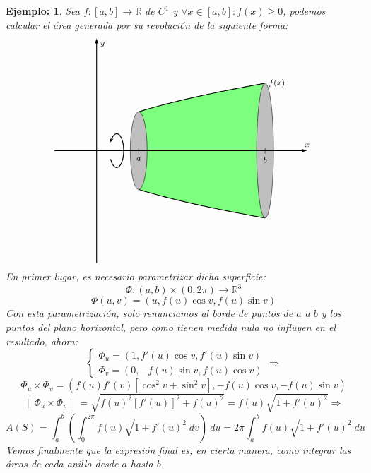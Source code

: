 \documentclass[10pt,a4paper,openright]{book}
\theoremstyle{break}
\newtheorem*{ej}{\underline{Ejemplo}:}
\newcommand{\dif}[1]{\ d#1}
\newcommand{\AxisRotator}[1][rotate=0]{
    \tikz [x=0.25cm,y=0.60cm,line width=.2ex,-stealth,#1] \draw (0,0) arc (-150:150:1 and 1);
    }
\begin{document}
\begin{ej}
Sea $f: \left[ a, b \right] \rightarrow \mathbb{R}$ de $C^1$ y $\forall x \in \left[ a, b \right]: f\left( x \right) \ge 0$, podemos calcular el área generada por su revolución de la siguiente forma:
$$      \begin{tikzpicture}[scale=1,>=latex,x=1.5cm,y=0.8cm]
        \fill[fill=green,opacity=0.5] (1,0) -- plot[domain=1:4] (\x,{sqrt(2*(\x)+1))}) -- (4,0);
        \fill[fill=green,opacity=0.5] (1,0) -- plot[domain=1:4] (\x,{-sqrt(2*(\x)+1))}) -- (4,0);
        \draw[-,thick,domain=1:4,samples=100] plot (\x,{sqrt(2*(\x)+1))}) node[right] {\footnotesize $f(x)$};
        \draw[-,thick,domain=1:4,samples=100] plot (\x,{-sqrt(2*(\x)+1))});
        \draw[fill=gray!50] (4,0) circle [x radius =.2 , y radius =3];
        \draw[fill=gray!50] (1,0) circle [x radius =.2 , y radius =1.732050808];

        \draw[->,thick] (-1,0) -- (5,0) node[above] {\footnotesize $x$};
        \draw[->,thick] (0,-5) -- (0,5) node[below right]{\footnotesize $y$};
        \draw[-] (1,3pt) -- (1,-3pt) node[below] {\footnotesize $a$};
        \draw[-] (4,3pt) -- (4,-3pt) node[below] {\footnotesize $b$};
   \draw (0.5,0) node {\AxisRotator}; 
    \end{tikzpicture}$$
En primer lugar, es necesario parametrizar dicha superficie:
$$\Phi: \left( a, b \right) \times \left( 0, 2\pi \right) \rightarrow \mathbb{R}^3$$
$$\Phi \left( u, v \right) = \left( u, f\left( u \right)\cos v, f\left( u \right)\sin v \right) $$
Con esta parametrización, solo renunciamos al borde de puntos de $a$ a $b$ y los puntos del plano horizontal, pero como tienen medida nula no influyen en el resultado, ahora: 
$$\begin{cases}
\Phi_u = \left( 1, f'\left( u \right) \cos v, f'\left( u \right) \sin v \right) \\ \Phi_v = \left( 0, -f\left( u \right) \sin v, f\left( u \right) \cos v \right)
\end{cases}\Rightarrow$$
$$\Phi_u \times \Phi_v = \left( f\left( u \right) f'\left( v \right) \left[ \cos^2 v + \sin^2 v \right], -f\left( u \right) \cos v, -f\left( u \right) \sin v \right)$$
$$\lVert \Phi_u \times \Phi_v \rVert = \sqrt{f\left( u \right)^2 \left[ f'\left( u \right) \right]^2 + f\left( u \right)^2} = f\left( u \right) \sqrt{1 + f'\left( u \right)^2} \Rightarrow$$
$$A\left( S \right) = \int_{a}^{b} \left( \int_{0}^{2\pi} f\left( u \right) \sqrt{1 + f'\left( u \right)^2} \dif{v} \right) \dif{u} = 2\pi \int_{a}^{b} f\left( u \right) \sqrt{1 + f'\left( u \right)^2} \dif{u} $$
Vemos finalmente que la expresión final es, en cierta manera, como integrar las áreas de cada anillo desde $a$ hasta $b$.
\end{ej}
\end{document}
